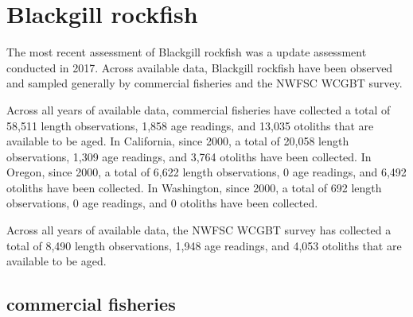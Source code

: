 \documentclass[11pt,
  english,
  letterpaper,
]{article}
\begin{document}

\hypertarget{blackgill-rockfish}{%
\section{Blackgill rockfish}\label{blackgill-rockfish}}

\leavevmode\tagmcend\tagstructend


The most recent assessment of Blackgill rockfish was a update assessment conducted in 2017. Across available data, Blackgill rockfish have been observed and sampled generally by commercial fisheries and the NWFSC WCGBT survey.

\leavevmode\tagmcend\tagstructend\par


Across all years of available data, commercial fisheries have collected a total of 58,511 length observations, 1,858 age readings, and 13,035 otoliths that are available to be aged. In California, since 2000, a total of 20,058 length observations, 1,309 age readings, and 3,764 otoliths have been collected. In Oregon, since 2000, a total of 6,622 length observations, 0 age readings, and 6,492 otoliths have been collected. In Washington, since 2000, a total of 692 length observations, 0 age readings, and 0 otoliths have been collected.

\leavevmode\tagmcend\tagstructend\par


Across all years of available data, the NWFSC WCGBT survey has collected a total of 8,490 length observations, 1,948 age readings, and 4,053 otoliths that are available to be aged.

\leavevmode\tagmcend\tagstructend\par


\hypertarget{commercial-fisheries-5}{%
\subsection{commercial fisheries}\label{commercial-fisheries-5}}

\leavevmode\tagmcend\tagstructend

\end{document}
